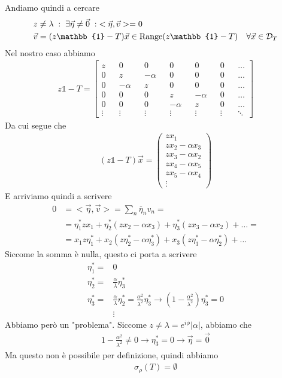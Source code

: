 Andiamo quindi a cercare 
\begin{align}
	&z\neq \lambda \taleche \exists \vec{\eta} \neq \vec{0} \taleche <\vec{\eta} , \vec{v}> =0 \\
	&\vec{v} = (z\mathbb{1} - T)\vec{x} \in \text{Range}(z\mathbb{1} - T) \quad \forall \vec{x}\in \mathcal{D}_T
\end{align}
Nel nostro caso abbiamo
\begin{align}
z\mathbb{1} - T= 
	\begin{bmatrix}
		z      && 0       && 0       && 0       && 0       && 0      && \dots\\
		0      && z       && -\alpha && 0       && 0       && 0      && \dots\\
		0 	   && -\alpha && z       && 0       && 0       && 0      && \dots\\
		0      && 0       && 0       && z       && -\alpha && 0      && \dots\\
		0 	   && 0       && 0       && -\alpha && z       && 0      && \dots\\
		\vdots && \vdots  && \vdots  && \vdots  && \vdots  && \vdots && \ddots
	\end{bmatrix}
\end{align}
Da cui segue che
\begin{align}
	(z\mathbb{1} - T)\vec{x} = \left( \begin{matrix}
		zx_1\\
		zx_2 - \alpha x_3\\
		zx_3 - \alpha x_2\\
		zx_4 - \alpha x_5\\
		zx_5 - \alpha x_4\\
		\vdots
	\end{matrix} \right)
\end{align}
E arriviamo quindi a scrivere
\begin{align}
	0 &= <\vec{\eta}, \vec{v} > = \sum_{n} \overline{\eta}_n v_n = \nonumber\\
	&= \eta_1^*zx_1 + \eta_2^*(zx_2 - \alpha x_3) + \eta_3^*(zx_3 - \alpha x_2) + \dots = \nonumber \\
	&= x_1z\eta_1^* + x_2(z\eta_2^* - \alpha \eta_3^*) + x_3(z\eta_3^* - \alpha \eta_2^*) + \dots
\end{align}
Siccome la somma è nulla, questo ci porta a scrivere
\begin{align}
	\eta^*_1 =& 0 \\
	\eta^*_2 =& \frac{\alpha}{\lambda} \eta^*_3\\
	\eta^*_3 =& \frac{\alpha}{\lambda} \eta^*_2 = \frac{\alpha^2}{\lambda^2} \eta^*_3 \to  \left(1-\frac{\alpha^2}{\lambda^2}\right) \eta^*_3 = 0\\
	&\vdots \nonumber
\end{align}
Abbiamo però un "problema". Siccome $z \neq \lambda = e^{i\phi} |\alpha|$, abbiamo che
\begin{align}
	1-\frac{\alpha^2}{\lambda^2} \neq 0 \to \eta_3^* = 0 \to \vec{\eta} = \vec{0}
\end{align}
Ma questo non è possibile per definizione, quindi abbiamo
\begin{align}
	\sigma_\rho(T) = \emptyset
\end{align}

